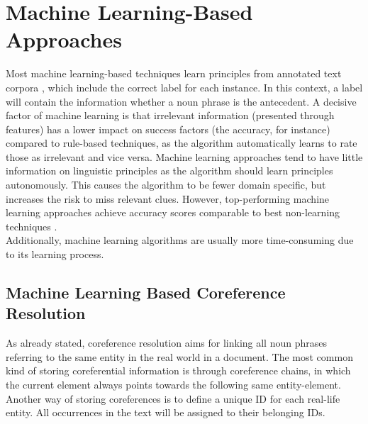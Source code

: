 \section{Machine Learning-Based Approaches}

Most machine learning-based techniques learn principles from annotated text corpora \citep{soon2001machine, bergsma2005automatic}, which include the correct label for each instance. In this context, a label will contain the information whether a noun phrase is the antecedent. A decisive factor of machine learning is that irrelevant information (presented through features) has a lower impact on success factors (the accuracy, for instance) compared to rule-based techniques, as the algorithm automatically learns to rate those as irrelevant and vice versa. Machine learning approaches tend to have little information on linguistic principles as the algorithm should learn principles autonomously. This causes the algorithm to be fewer domain specific, but increases the risk to miss relevant clues. However, top-performing machine learning approaches achieve accuracy scores comparable to best non-learning techniques \citep{soon2001machine}. \\
Additionally, machine learning algorithms are usually more time-consuming due to its learning process.

\subsection{Machine Learning Based Coreference Resolution}
\label{soon2001traininginstances}

As already stated, coreference resolution aims for linking all noun phrases referring to the same entity in the real world in a document. The most common kind of storing coreferential information is through coreference chains, in which the current element always points towards the following same entity-element. Another way of storing coreferences is to define a unique ID for each real-life entity. All occurrences in the text will be assigned to their belonging IDs.

